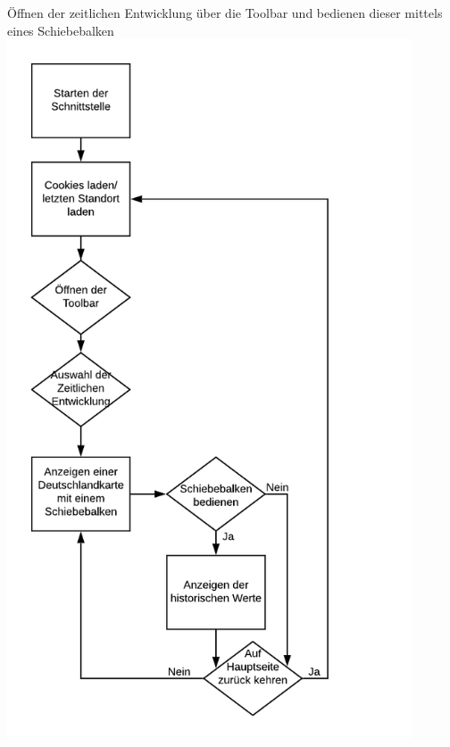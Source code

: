 Öffnen der zeitlichen Entwicklung über die Toolbar und bedienen dieser mittels eines Schiebebalken
\includegraphics[width=0.9\textwidth]{media/Zeitliche-Entwicklung-Diagramm} 